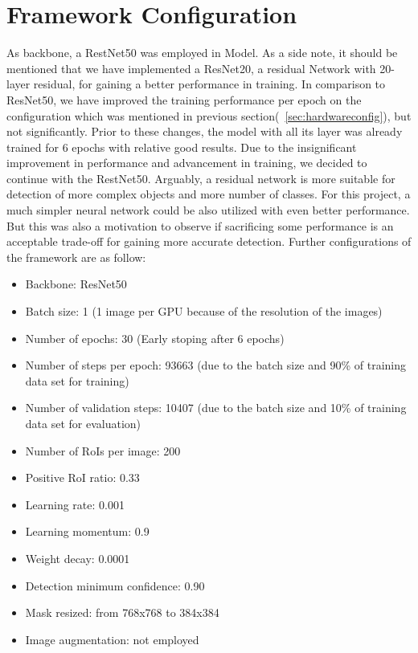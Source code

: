 \section{Framework Configuration}
\label{sec:framworkconfig}

As backbone, a RestNet50 was employed in Model. As a side note, it should be mentioned that we have implemented a ResNet20, a residual Network with 20-layer residual, for gaining a better performance in training. In comparison to ResNet50, we have improved the training performance per epoch on the configuration which was mentioned in previous section(~\ref{sec:hardwareconfig}), but not significantly. Prior to these changes, the model with all its layer was already trained for 6 epochs with relative good results. Due to the insignificant improvement in performance and advancement in training, we decided to continue with the RestNet50. Arguably, a residual network is more suitable for detection of more complex objects and more number of classes. For this project, a much simpler neural network could be also utilized with even better performance. But this was also a motivation to observe if sacrificing some performance is an acceptable trade-off for gaining more accurate detection. Further configurations of the framework are as follow:
\begin{itemize}
\item Backbone: ResNet50
\item Batch size: 1 (1 image per GPU because of the resolution of the images)
\item Number of epochs: 30 (Early stoping after 6 epochs)
\item Number of steps per epoch: 93663 (due to the batch size and 90\% of training data set for training)
\item Number of validation steps:  10407 (due to the batch size and 10\% of training data set for evaluation)
\item Number of RoIs per image: 200
\item Positive RoI ratio: 0.33
\item Learning rate: 0.001
\item Learning momentum:  0.9
\item Weight decay: 0.0001
\item Detection minimum confidence: 0.90
\item Mask resized: from 768x768 to 384x384
\item Image augmentation: not employed
\end{itemize}

